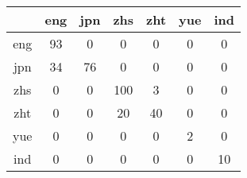 \documentclass{article}
\begin{document}
\centering
\begin{table}[!h]

\begin{tabular}{|c|c|c|c|c|c|c|}
\hline 

& eng & jpn & zhs & zht & yue & ind \\
\hline 
eng & 93 & 0 & 0 & 0 & 0 & 0 \\
\hline 
jpn & 34 & 76 & 0 & 0 & 0 & 0 \\
\hline 
zhs & 0 & 0 & 100 & 3 & 0 & 0 \\
\hline 
zht & 0 & 0 & 20 & 40 & 0 & 0 \\
\hline 
yue & 0 & 0 & 0 & 0 & 2 & 0 \\
\hline 
ind & 0 & 0 & 0 & 0 & 0 & 10 \\
\hline

\end{tabular}
\end{table}
\end{document}
